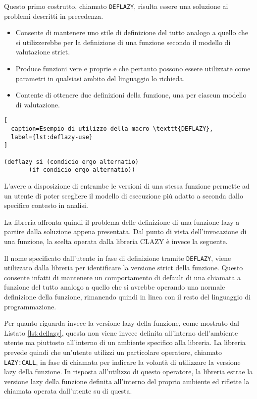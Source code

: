 Questo primo costrutto, chiamato \texttt{DEFLAZY}, risulta essere una soluzione
ai problemi descritti in precedenza.

\begin{itemize}

\item Consente di mantenere uno stile di definizione del tutto analogo a quello
che si utilizzerebbe per la definizione di una funzione secondo il modello di
valutazione strict.

\item Produce funzioni vere e proprie e che pertanto possono essere utilizzate
come parametri in qualsiasi ambito del linguaggio lo richieda.

\item Contente di ottenere due definizioni della funzione, una per ciascun
modello di valutazione.

\end{itemize}

\begin{lstlisting}[
  caption=Esempio di utilizzo della macro \texttt{DEFLAZY},
  label={lst:deflazy-use}
]

(deflazy si (condicio ergo alternatio)
       (if condicio ergo alternatio))

\end{lstlisting}

L'avere a disposizione di entrambe le versioni di una stessa funzione permette
ad un utente di poter scegliere il modello di esecuzione più adatto a seconda
dallo specifico contesto in analisi.

La libreria affronta quindi il problema delle definizione di una funzione lazy a
partire dalla soluzione appena presentata. Dal punto di vista dell'invocazione
di una funzione, la scelta operata dalla libreria CLAZY è invece la seguente.

Il nome specificato dall'utente in fase di definizione tramite \texttt{DEFLAZY},
viene utilizzato dalla libreria per identificare la versione strict della
funzione. Questo consente infatti di mantenere un comportamento di default di
una chiamata a funzione del tutto analogo a quello che si avrebbe operando una
normale definizione della funzione, rimanendo quindi in linea con il resto del
linguaggio di programmazione.

Per quanto riguarda invece la versione lazy della funzione, come mostrato dal
Listato \ref{lst:deflazy}, questa non viene invece definita all'interno
dell'ambiente utente ma piuttosto all'interno di un ambiente specifico alla
libreria. La libreria prevede quindi che un'utente utilizzi un particolare
operatore, chiamato \texttt{LAZY:CALL}, in fase di chiamata per indicare la
volontà di utilizzare la versione lazy della funzione. In risposta all'utilizzo
di questo operatore, la libreria estrae la versione lazy della funzione definita
all'interno del proprio ambiente ed riflette la chiamata operata dall'utente su
di questa.

